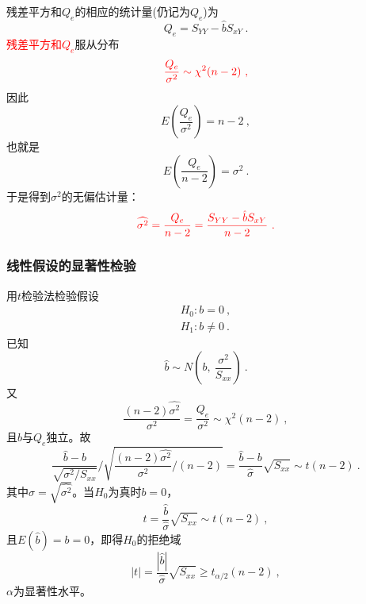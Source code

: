 \documentclass[12pt,a4paper]{article}
\begin{document}
残差平方和$Q_e$的相应的统计量(仍记为$Q_e$)为
\begin{equation}
Q_e = S_{YY} -\hat{b} S_{xY} ~.
\end{equation}
\textcolor{red}{残差平方和$Q_e$}服从分布
\begin{equation}
\color{red} \frac{Q_e}{\sigma^2} \sim \chi^2 (n-2) ~,
\end{equation}
因此
\begin{equation*}
E\left( \frac{Q_e}{\sigma^2}\right) = n-2 ~,
\end{equation*}
也就是
\begin{equation*}
E\left( \frac{Q_e}{n-2}\right) = \sigma^2 ~.
\end{equation*}
于是得到$\sigma^2$的无偏估计量：
\begin{equation}
\color{red} \widehat{\sigma^2}  = \frac{Q_e}{n-2} = \frac{S_{YY} -\hat{b} S_{xY}}{n-2} ~.
\end{equation}


\subsubsection{线性假设的显著性检验}
用$t$检验法检验假设
\begin{eqnarray}
\nonumber H_0 : b = 0 ~, \\
H_1 : b \neq 0 ~.
\end{eqnarray}
已知
\begin{equation}
\hat{b} \sim N\left(b, ~\frac{\sigma^2}{S_{xx}} \right) ~.
\end{equation}
又
\begin{equation}
\frac{(n-2) \widehat{\sigma^2}}{\sigma^2} = \frac{Q_e}{\sigma^2} \sim \chi^2 (n-2) ~,
\end{equation}
且$\hat{b}$与$Q_e$独立。故
\begin{equation*}
\frac{\hat{b} -b}{\sqrt{\sigma^2/S_{xx} } }\bigg/\sqrt{\frac{(n-2)\widehat{\sigma^2}}{\sigma^2}\bigg/(n-2)} = \frac{\hat{b} -b}{\hat{\sigma} } \sqrt{S_{xx}} \sim  t(n-2) ~.
\end{equation*}
其中$\hat{\sigma} = \sqrt{\widehat{\sigma^2}}$。当$H_0$为真时$b=0$，
\begin{equation}
t = \frac{\hat{b} }{\hat{\sigma} } \sqrt{S_{xx}} \sim t(n-2) ~,
\end{equation}
且$E(\hat{b}) = b = 0$，即得$H_0$的拒绝域
\begin{equation}
|t| = \frac{|\hat{b}|}{\hat{\sigma} } \sqrt{S_{xx}}  \geqslant t_{\alpha/2} (n-2) ~,
\end{equation}
$\alpha$为显著性水平。
\end{document}
